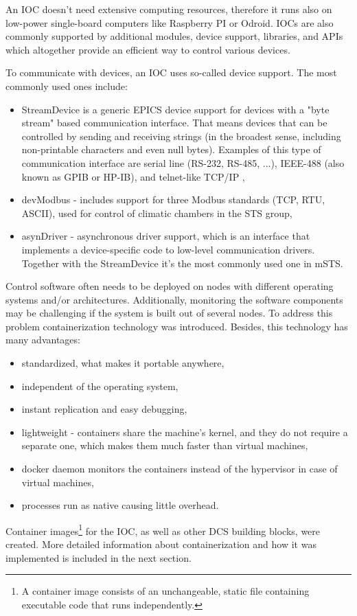 An \gls{IOC} doesn't need extensive computing resources, therefore it runs also on low-power single-board computers like Raspberry PI or Odroid. 
 \glspl{IOC} are also commonly supported by additional modules, device support, libraries, and \glspl{API} which altogether provide an efficient way to control various devices.

 
To communicate with devices, an \gls{IOC} uses so-called device support. The most commonly used ones include:
\begin{itemize}
    \item StreamDevice is a generic EPICS device support for devices with a "byte stream" based communication interface. That means devices that can be controlled by sending and receiving strings (in the broadest sense, including non-printable characters and even null bytes). Examples of this type of communication interface are serial line (RS-232, RS-485, ...), IEEE-488 (also known as GPIB or HP-IB), and telnet-like TCP/IP \cite{StreamDevice},
    \item devModbus \cite{modbus} - includes support for three Modbus standards (TCP, RTU, ASCII), used for control of climatic chambers in the \gls{STS} group,
    \item asynDriver \cite{asyn} - asynchronous driver support, which is an interface that implements a device-specific code to low-level communication drivers. Together with the StreamDevice it's the most commonly used one in \gls{mSTS}. 
\end{itemize}

Control software often needs to be deployed on nodes with different operating systems and/or architectures. Additionally, monitoring the software components may be challenging if the system is built out of several nodes. To address this problem containerization technology was introduced. Besides, this technology has many advantages:
\begin{itemize}
    \item standardized, what makes it portable anywhere,
    \item independent of the operating system,
    \item instant replication and easy debugging,
    \item lightweight - containers share the machine's kernel, and they do not require a separate one, which makes them much faster than virtual machines,
    \item docker daemon monitors the containers instead of the hypervisor in case of virtual machines,
    \item processes run as native causing little overhead.
\end{itemize}

Container images\footnote{A container image consists of an unchangeable, static file containing executable code that runs independently.} for the \gls{IOC}, as well as other \gls{DCS} building blocks, were created. More detailed information about containerization and how it was implemented is included in the next section.
 
